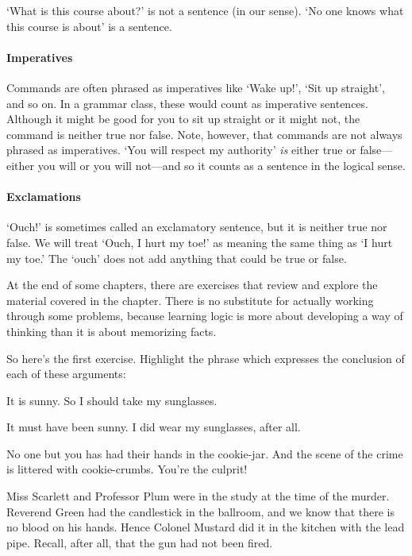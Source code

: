 `What is this course about?' is not a sentence (in our sense). `No one knows what this course is about' is a sentence.

\paragraph{Imperatives} Commands are often phrased as imperatives like `Wake up!', `Sit up straight', and so on. In a grammar class, these would count as imperative sentences. Although it might be good for you to sit up straight or it might not, the command is neither true nor false. Note, however, that commands are not always phrased as imperatives. `You will respect my authority' \emph{is} either true or false---either you will or you will not---and so it counts as a sentence in the logical sense.

\paragraph{Exclamations} `Ouch!' is sometimes called an exclamatory sentence, but it is neither true nor false. We will treat `Ouch, I hurt my toe!' as meaning the same thing as `I hurt my toe.' The `ouch' does not add anything that could be true or false.


\practiceproblems
At the end of some chapters, there are exercises that review and explore the material covered in the chapter. There is no substitute for actually working through some problems, because learning logic is more about developing a way of thinking than it is about memorizing facts.

\medskip

So here's the first exercise. Highlight the phrase which expresses the conclusion of each of these arguments:
\begin{earg}
	\item It is sunny. So I should take my sunglasses.
	\item It must have been sunny. I did wear my sunglasses, after all.
	\item No one but you has had their hands in the cookie-jar. And the scene of the crime is littered with cookie-crumbs. You're the culprit!
	\item Miss Scarlett and Professor Plum were in the study at the
	time of the murder. Reverend Green had the candlestick in the
	ballroom, and we know that there is no blood on his hands. Hence
	Colonel Mustard did it in the kitchen with the lead pipe.
	Recall, after all, that the gun had not been fired.
\end{earg}


